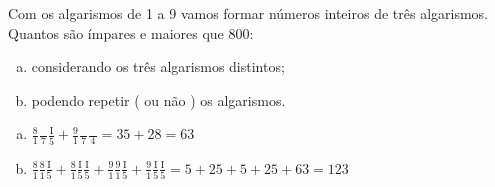 \begin{ex}
 Com os algarismos de 1 a 9 vamos formar números inteiros de três algarismos. Quantos são ímpares e maiores que 800: \\
   \begin{enumerate} [(a)]
       \item considerando os três algarismos distintos;
       \item podendo repetir ( ou não ) os algarismos.
   \end{enumerate}
     \begin{sol}
      \phantom{A}
       \begin{enumerate} [(a)]
           \item $\frac{8}{1}\frac{\phantom{A}}{7}\frac{\mathrm{I}}{5}+\frac{9}{1}\frac{\phantom{A}}{7}\frac{\phantom{A}}{4}=35+28=63$
           \item $\frac{8}{1}\frac{8}{1}\frac{\mathrm{I}}{5}+\frac{8}{1}\frac{\mathrm{I}}{5}\frac{\mathrm{I}}{5}+\frac{9}{1}\frac{9}{1}\frac{\mathrm{I}}{5}+\frac{9}{1}\frac{\mathrm{I}}{5}\frac{\mathrm{I}}{5}=5+25+5+25+63=123$
       \end{enumerate}
     
     \end{sol}

\end{ex}